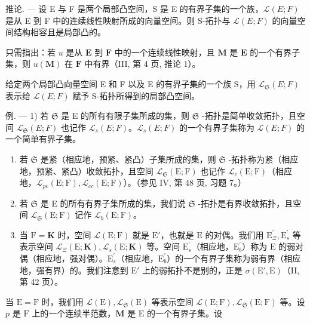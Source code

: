 推论. --- 设 E 与 F 是两个局部凸空间，S 是 E 的有界子集的一个族，\(\mathcal{L}(E; F)\) 是从 E 到 F 中的连续线性映射所成的向量空间。则 S-拓扑与 \(\mathcal{L}(E; F)\) 的向量空间结构相容且是局部凸的。

只需指出：若 \(u\) 是从 \(\mathbf{E}\) 到 \(\mathbf{F}\) 中的一个连续线性映射，且 \(\mathbf{M}\) 是 \(\mathbf{E}\) 的一个有界子集，则 \(u(\mathbf{M})\) 在 \(\mathbf{F}\) 中有界（III, 第 4 页, 推论 1）。

给定两个局部凸向量空间 E 和 F 以及 E 的有界子集的一个族 S，用 \(\mathcal{L}_{\mathfrak{S}}(E;F)\) 表示给 \(\mathcal{L}(E;F)\) 赋予 S-拓扑所得到的局部凸空间。

例. --- 1) 若 \(\mathfrak{S}\) 是 E 的所有有限子集所成的集，则 \(\mathfrak{S}\) -拓扑是简单收敛拓扑，且空间 \(\mathcal{L}_{\mathfrak{S}}(E; F)\) 也记作 \(\mathcal{L}_s(E; F)\)。\(\mathcal{L}_s(E; F)\) 的一个有界子集称为 \(\mathcal{L}(E; F)\) 的一个简单有界子集。

\begin{enumerate}
\def\labelenumi{\arabic{enumi})}
\setcounter{enumi}{1}
\item
  若 \(\mathfrak{S}\) 是紧（相应地，预紧、紧凸）子集所成的集，则 \(\mathfrak{S}\) -拓扑称为紧（相应地，预紧、紧凸）收敛拓扑，且空间 \(\mathcal{L}_{\mathfrak{S}}(\mathrm{E};\mathrm{F})\) 也记作 \(\mathcal{L}_c(\mathrm{E};\mathrm{F})\)（相应地，\(\mathcal{L}_{pc}(\mathrm{E};\mathrm{F}),\mathcal{L}_{cc}(\mathrm{E};\mathrm{F})\)）。（参见 IV, 第 48 页, 习题 7。）
\item
  若 \(\mathfrak{S}\) 是 E 的所有有界子集所成的集，我们说 \(\mathfrak{S}\) -拓扑是有界收敛拓扑，且空间 \(\mathcal{L}_{\mathfrak{S}}(\mathrm{E};\mathrm{F})\) 记作 \(\mathcal{L}_b(\mathrm{E};\mathrm{F})\)。
\item
  当 \(\mathrm{F} = \mathbf{K}\) 时，空间 \(\mathcal{L}(\mathrm{E};\mathrm{F})\) 就是 \(\mathrm{E}'\)，也就是 \(\mathrm{E}\) 的对偶。我们用 \(\mathrm{E}_{\Xi}^{\prime}, \mathrm{E}_{s}^{\prime}\) 等表示空间 \(\mathcal{L}_{\Xi}(\mathrm{E};\mathbf{K}), \mathcal{L}_s(\mathrm{E};\mathbf{K})\) 等。空间 \(\mathrm{E}_s^\prime\)（相应地，\(\mathrm{E}_b^\prime\)）称为 \(\mathrm{E}\) 的弱对偶（相应地，强对偶）。\(\mathrm{E}_s^\prime\)（相应地，\(\mathrm{E}_b^\prime\)）的一个有界子集称为弱有界（相应地，强有界）的。我们注意到 \(\mathrm{E}'\) 上的弱拓扑不是别的，正是 \(\sigma (\mathrm{E}',\mathrm{E})\)（II, 第 42 页）。
\end{enumerate}

当 \(\mathrm{E} = \mathrm{F}\) 时，我们用 \(\mathcal{L}(\mathrm{E}), \mathcal{L}_{\mathfrak{S}}(\mathrm{E})\) 等表示空间 \(\mathcal{L}(\mathrm{E};\mathrm{F}), \mathcal{L}_{\mathfrak{S}}(\mathrm{E};\mathrm{F})\) 等。设 \(p\) 是 \(\mathrm{F}\) 上的一个连续半范数，\(\mathbf{M}\) 是 \(\mathrm{E}\) 的一个有界子集。设

